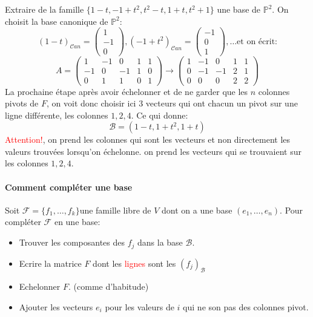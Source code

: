 \begin{exemple}
    Extraire de la famille $\{1 - t, -1 + t^2, t^2 - t, 1 + t, t^2 + 1\}$ une base de $\mathbb{P}^2$. On choisit la base canonique de $\mathbb{P}^2$:
    \[(1-t)_{\mathcal{C}an} = \begin{pmatrix}
        1 \\ -1 \\ 0
    \end{pmatrix}, (-1+t^2)_{\mathcal{C}an} = \begin{pmatrix}
        -1 \\ 0 \\ 1
    \end{pmatrix}, \dots \text{et on écrit:}\]
    \[A = \begin{pmatrix}
         1 &-1&0 & 1 & 1 \\
        -1&0&-1&1&0\\
         0&1&1&0&1
    \end{pmatrix} \to \begin{pmatrix}
         1 &-1&0 & 1 & 1 \\
        0&-1&-1&2&1\\
         0&0&0&2&2
    \end{pmatrix}\]
    La prochaine étape après avoir échelonner et de ne garder que les $n$ colonnes pivots de $F$, on voit donc choisir ici $3$ vecteurs qui ont chacun un pivot sur une ligne différente, les colonnes $1, 2, 4$. Ce qui donne:
    \[\mathcal{B} = (1-t, 1+t^2, 1+t)\] \textcolor{red}{Attention!}, on prend les colonnes qui sont les vecteurs et non directement les valeurs trouvées lorsqu'on échelonne. on prend les vecteurs qui se trouvaient sur les colonnes $1, 2, 4$.
\end{exemple}

\paragraph{Comment compléter une base}
Soit $\mathcal{F} = \{f_1, \dots, f_k\}$une famille libre de $V$ dont on a une base $(e_1, \dots, e_n)$. Pour compléter $\mathcal{F}$ en une base:
\begin{itemize}
    \item Trouver les composantes des $f_j$ dans la base $\mathcal{B}$.
    \item Ecrire la matrice $F$ dont les \textcolor{red}{lignes} sont les $(f_j)_{\mathcal{B}}$
    \item Echelonner $F$. (comme d'habitude)
    \item Ajouter les vecteurs $e_i$ pour les valeurs de $i$ qui ne son pas des colonnes pivot.
\end{itemize}

